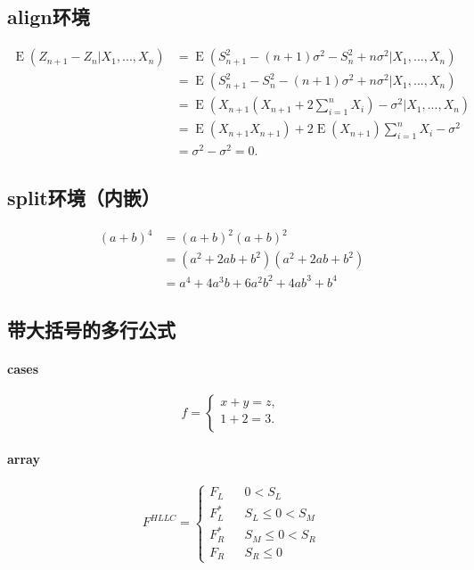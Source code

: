 \subsection{align环境}
\begin{align*}
\operatorname{E} (Z_{n+1} - Z_n | X_1,..., X_n)
&= \operatorname{E} (S_{n+1}^2 - (n+1) \sigma^2 - S_n^2 + n \sigma^2 | X_1,..., X_n) \\
&= \operatorname{E} (S_{n+1}^2 - S_n^2 - (n+1) \sigma^2 + n \sigma^2 | X_1,..., X_n) \\
&= \operatorname{E} (X_{n+1}(X_{n+1} + 2\sum_{i=1}^n X_i) - \sigma^2 | X_1,..., X_n) \\
&= \operatorname{E} (X_{n+1}X_{n+1})
+ 2\operatorname{E} (X_{n+1}) \sum_{i=1}^n X_i - \sigma^2 \\
&= \sigma^2  - \sigma^2 =0.
\end{align*}

\subsection{split环境（内嵌）}
\begin{equation*}
\begin{split}
(a + b)^4
&= (a + b)^2 (a + b)^2      \\
&= (a^2 + 2ab + b^2)
(a^2 + 2ab + b^2)        \\
&= a^4 + 4a^3b + 6a^2b^2 + 4ab^3 + b^4
\end{split}
\end{equation*}

\subsection{带大括号的多行公式}
\paragraph{cases}
$$
f=
\begin{cases}
x + y = z,  \\
1 + 2 = 3.  \\
\end{cases}
$$

\paragraph{array}
$$ F^{HLLC}=\left\{
\begin{array}{rcl}
F_L       &      & {0      <      S_L}\\
F^*_L     &      & {S_L \leq 0 < S_M}\\
F^*_R     &      & {S_M \leq 0 < S_R}\\
F_R       &      & {S_R \leq 0}
\end{array} \right. $$

